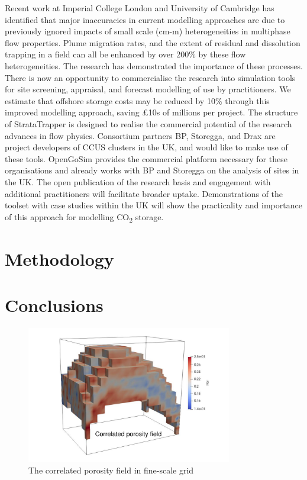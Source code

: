 \documentclass{article}
\def\CO2{CO\textsubscript{2}}
\begin{document}
Recent work at Imperial College London and University of Cambridge has identified that major inaccuracies in current modelling approaches are due to previously ignored impacts of small scale (cm-m) heterogeneities in multiphase flow properties. Plume migration rates, and the extent of residual and dissolution trapping in a field can all be enhanced by over 200\% by these flow heterogeneities. The research has demonstrated the importance of these processes. There is now an opportunity to commercialise the research into simulation tools for site screening, appraisal, and forecast modelling of use by practitioners.
We estimate that offshore storage costs may be reduced by 10\% through this improved modelling approach, saving £10s of millions per project. The structure of StrataTrapper is designed to realise the commercial potential of the research advances in flow physics.
Consortium partners BP, Storegga, and Drax are project developers of CCUS clusters in the UK, and would like to make use of these tools. OpenGoSim provides the commercial platform necessary for these organisations and already works with BP and Storegga on the analysis of sites in the UK.\@
The open publication of the research basis and engagement with additional practitioners will facilitate broader uptake. Demonstrations of the toolset with case studies within the UK will show the practicality and importance of this approach for modelling \CO2 storage.

\section{Methodology}\label{sec:method}



\section{Conclusions}\label{sec:Conclusions}

\begin{figure}[H]
    \centering    \centerline{\includegraphics[width=0.8\textwidth]{Figures/porosity.pdf}}
    \caption{The correlated porosity field in fine-scale grid}\label{porosity}
\end{figure}
\end{document}
